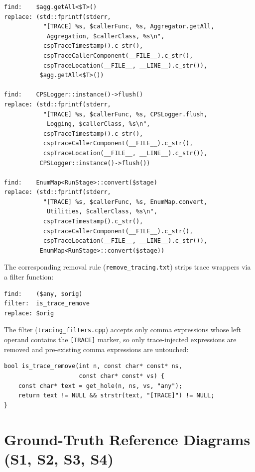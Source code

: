\begin{verbatim}
find:    $agg.getAll<$T>()
replace: (std::fprintf(stderr,
           "[TRACE] %s, $callerFunc, %s, Aggregator.getAll,
            Aggregation, $callerClass, %s\n",
           cspTraceTimestamp().c_str(),
           cspTraceCallerComponent(__FILE__).c_str(),
           cspTraceLocation(__FILE__, __LINE__).c_str()),
          $agg.getAll<$T>())

find:    CPSLogger::instance()->flush()
replace: (std::fprintf(stderr,
           "[TRACE] %s, $callerFunc, %s, CPSLogger.flush,
            Logging, $callerClass, %s\n",
           cspTraceTimestamp().c_str(),
           cspTraceCallerComponent(__FILE__).c_str(),
           cspTraceLocation(__FILE__, __LINE__).c_str()),
          CPSLogger::instance()->flush())

find:    EnumMap<RunStage>::convert($stage)
replace: (std::fprintf(stderr,
           "[TRACE] %s, $callerFunc, %s, EnumMap.convert,
            Utilities, $callerClass, %s\n",
           cspTraceTimestamp().c_str(),
           cspTraceCallerComponent(__FILE__).c_str(),
           cspTraceLocation(__FILE__, __LINE__).c_str()),
          EnumMap<RunStage>::convert($stage))
\end{verbatim}

The corresponding removal rule (\texttt{remove\_tracing.txt}) strips
trace wrappers via a filter function:

\begin{verbatim}
find:    ($any, $orig)
filter:  is_trace_remove
replace: $orig
\end{verbatim}

The filter (\texttt{tracing\_filters.cpp}) accepts only comma
expressions whose left operand contains the \texttt{[TRACE]} marker, so
only trace-injected expressions are removed and pre-existing comma
expressions are untouched:

\begin{verbatim}
bool is_trace_remove(int n, const char* const* ns,
                     const char* const* vs) {
    const char* text = get_hole(n, ns, vs, "any");
    return text != NULL && strstr(text, "[TRACE]") != NULL;
}
\end{verbatim}

\section{Ground-Truth Reference Diagrams (S1, S2, S3, S4)}
\label{sec:appendix-groundtruth}

